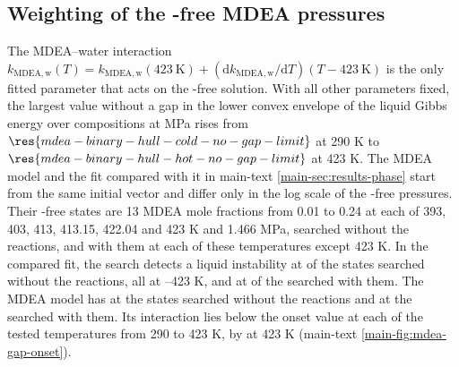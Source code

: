 \documentclass[a4paper,11pt]{article}
\begin{document}
\subsection{Weighting of the \COtwo-free MDEA pressures}\label{sec:s-mdea-bound}
The MDEA--water interaction $k_{\mathrm{MDEA,w}}(T)=k_{\mathrm{MDEA,w}}(423\ \mathrm{K})+(\mathrm{d}k_{\mathrm{MDEA,w}}/\mathrm{d}T)(T-423\ \mathrm{K})$ is the only fitted parameter that acts on the \COtwo-free solution.
With all other parameters fixed, the largest value without a gap in the lower convex envelope of the liquid Gibbs energy over  compositions at  MPa rises from $\res{mdea-binary-hull-cold-no-gap-limit}$ at 290 K to $\res{mdea-binary-hull-hot-no-gap-limit}$ at 423 K.
The MDEA model and the fit compared with it in main-text \cref{main-sec:results-phase} start from the same initial vector and differ only in the log scale of the \COtwo-free pressures.
Their \COtwo-free states are 13 MDEA mole fractions from 0.01 to 0.24 at each of 393, 403, 413, 413.15, 422.04 and 423 K and 1.466 MPa, searched without the reactions, and with them at each of these temperatures except 423 K.
In the compared fit, the search detects a liquid instability at  of the  states searched without the reactions, all at --423 K, and at  of the  searched with them.
The MDEA model has  at the  states searched without the reactions and  at the  searched with them.
Its interaction lies below the onset value at each of the  tested temperatures from 290 to 423 K, by  at 423 K (main-text \cref{main-fig:mdea-gap-onset}).
\end{document}
